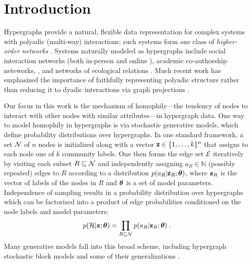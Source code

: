 \documentclass[aps,pre,reprint,superscriptaddress,nofootinbib]{revtex4-2}
\begin{document}
\section{Introduction}

    Hypergraphs provide a natural, flexible data representation for complex systems with polyadic (multi-way) interactions; such systems form one class of \emph{higher-order networks} \cite{battistonNetworksPairwiseInteractions2020,bick2023higher}.
    Systems naturally modeled as hypergraphs include social interaction networks (both in-person \cite{mastrandrea2015contact} and online \cite{bensonSimplicialClosureHigherorder2018}), academic co-authorship neteworks, \cite{wu2022hypergraph}, and networks of ecological relations \cite{levine2017beyond}. 
    Much recent work has emphasized the importance of faithfully representing polyadic structure rather than reducing it to dyadic interactions via graph projections \cite{battistonNetworksPairwiseInteractions2020,bick2023higher} .

    Our focus in this work is the mechanism of homophily---the tendency of nodes to interact with other nodes with similar attributes---in hypergraph data. 
    One way to model homophily in hypergraphs is via stochastic generative models, which define probability distributions over hypergraphs. 
    In one standard framework, a set $\mathcal{N}$ of $n$ nodes is initialized along with a vector $\mathbf{z} \in \{1,\ldots,k\}^n$ that assigns to each node one of $k$ community labels. 
    One then forms the edge set $\mathcal{E}$ iteratively by visiting each subset $R \subseteq \mathcal{N}$ and independently assigning $a_R \in \mathbb{N}$ (possibly repeated) edges to $R$ according to a distribution $p(a_R | \mathbf{z}_R ;\boldsymbol{\theta})$, where $\mathbf{z}_R$ is the vector of labels of the nodes in $R$ and $\boldsymbol{\theta}$ is a set of model parameters.
    Independence of sampling results in a probability distribution over hypergraphs which can be factorized into a product of edge probabilities conditioned on the node labels and model parameters: 
    \begin{align}
        p(\mathcal{H} | \mathbf{z}; \boldsymbol{\theta}) = \prod_{R \subseteq \mathcal{N}} p(a_R | \mathbf{z}_R; \boldsymbol{\theta}) \;. \label{eq:edge-independence}
    \end{align}
    Many generative models fall into this broad scheme, including hypergraph stochastic block models and some of their generalizations \cite{chodrowGenerativeHypergraphClustering2021,ruggeriCommunityDetectionLarge2023,kim2018stochastic,badalyanStructureInferenceHypergraphs2024,hood2026broad}.
\end{document}
